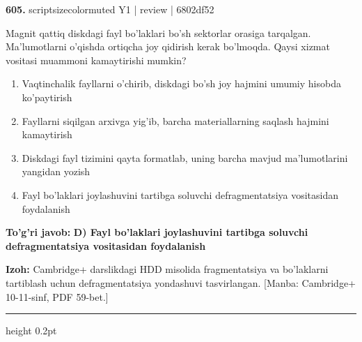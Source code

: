 \documentclass[10pt,a4paper]{article}
\begin{document}
{\bfseries\sffamily\color{ink} 605.} {scriptsizecolor{muted} Y1 | review | 6802df52}
\par
Magnit qattiq diskdagi fayl bo'laklari bo'sh sektorlar orasiga tarqalgan. Ma'lumotlarni o'qishda ortiqcha joy qidirish kerak bo'lmoqda. Qaysi xizmat vositasi muammoni kamaytirishi mumkin?
\begin{enumerate}[label=\Alph*),leftmargin=9mm]
\item Vaqtinchalik fayllarni o'chirib, diskdagi bo'sh joy hajmini umumiy hisobda ko'paytirish
\item Fayllarni siqilgan arxivga yig'ib, barcha materiallarning saqlash hajmini kamaytirish
\item Diskdagi fayl tizimini qayta formatlab, uning barcha mavjud ma'lumotlarini yangidan yozish
\item Fayl bo'laklari joylashuvini tartibga soluvchi defragmentatsiya vositasidan foydalanish
\end{enumerate}
\begin{tcolorbox}[enhanced,breakable,colback=teal!4,colframe=teal!60!black,boxrule=0.45pt,arc=1.2mm,left=2.7mm,right=2.7mm,top=1.8mm,bottom=1.8mm,before skip=2mm,after skip=2mm]
{\bfseries\sffamily\color{teal}To'g'ri javob:} \textbf{D) Fayl bo'laklari joylashuvini tartibga soluvchi defragmentatsiya vositasidan foydalanish}
\par\smallskip
{\bfseries Izoh:} Cambridge+ darslikdagi HDD misolida fragmentatsiya va bo'laklarni tartiblash uchun defragmentatsiya yondashuvi tasvirlangan. [Manba: Cambridge+ 10-11-sinf, PDF 59-bet.]
\end{tcolorbox}
\vspace{2mm}\hrule height 0.2pt\vspace{3mm}
\end{document}

